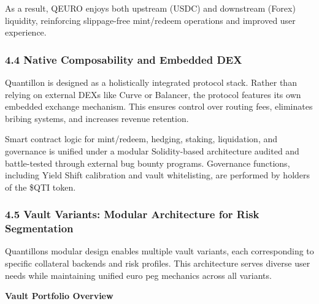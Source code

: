 As a result, QEURO enjoys both upstream (USDC) and downstream (Forex)
liquidity, reinforcing slippage-free mint/redeem operations and improved
user experience.

\hypertarget{native-composability-and-embedded-dex}{%
\subsubsection{4.4 Native Composability and Embedded
DEX}\label{native-composability-and-embedded-dex}}

Quantillon is designed as a holistically integrated protocol stack.
Rather than relying on external DEXs like Curve or Balancer, the
protocol features its own embedded exchange mechanism. This ensures
control over routing fees, eliminates bribing systems, and increases
revenue retention.

Smart contract logic for mint/redeem, hedging, staking, liquidation, and
governance is unified under a modular Solidity-based architecture
audited and battle-tested through external bug bounty programs.
Governance functions, including Yield Shift calibration and vault
whitelisting, are performed by holders of the \$QTI token.

\hypertarget{vault-variants-modular-architecture-for-risk-segmentation}{%
\subsubsection{4.5 Vault Variants: Modular Architecture for Risk
Segmentation}\label{vault-variants-modular-architecture-for-risk-segmentation}}

Quantillon\textquotesingle s modular design enables multiple vault
variants, each corresponding to specific collateral backends and risk
profiles. This architecture serves diverse user needs while maintaining
unified euro peg mechanics across all variants.

\textbf{Vault Portfolio Overview}

